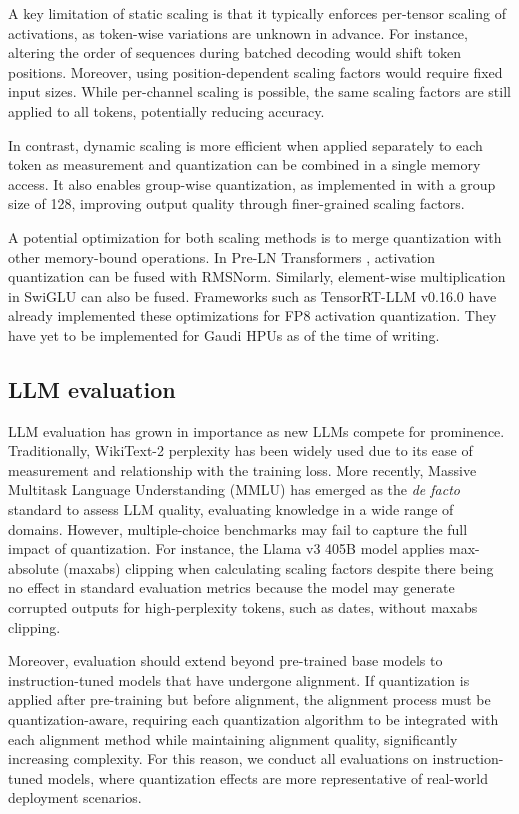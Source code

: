 A key limitation of static scaling is that it typically enforces per-tensor scaling of activations, as token-wise variations are unknown in advance. For instance, altering the order of sequences during batched decoding would shift token positions. Moreover, using position-dependent scaling factors would require fixed input sizes. While per-channel scaling \citep{xiao2024smoothquantaccurateefficientposttraining} is possible, the same scaling factors are still applied to all tokens, potentially reducing accuracy.

In contrast, dynamic scaling is more efficient when applied separately to each token as measurement and quantization can be combined in a single memory access. It also enables group-wise quantization, as implemented in \citet{deepseekai2024deepseekv3technicalreport} with a group size of 128, improving output quality through finer-grained scaling factors.

A potential optimization for both scaling methods is to merge quantization with other memory-bound operations. In Pre-LN Transformers \citep{pre_ln_transformers}, activation quantization can be fused with RMSNorm. Similarly, element-wise multiplication in SwiGLU \citep{shazeer2020gluvariantsimprovetransformer} can also be fused. Frameworks such as TensorRT-LLM \citep{TensorRT_LLM} v0.16.0 have already implemented these optimizations for FP8 activation quantization. 
They have yet to be implemented for Gaudi HPUs as of the time of writing.

\subsection{LLM evaluation}

LLM evaluation has grown in importance as new LLMs compete for prominence. Traditionally, WikiText-2 perplexity \citep{merity2017pointer} has been widely used due to its ease of measurement and relationship with the training loss. More recently, Massive Multitask Language Understanding (MMLU) \citep{hendrycks2021measuring} has emerged as the \textit{de facto} standard to assess LLM quality, evaluating knowledge in a wide range of domains. However, multiple-choice benchmarks may fail to capture the full impact of quantization. For instance, the Llama v3 405B model \citep{grattafiori2024llama3herdmodels} applies max-absolute (maxabs) clipping when calculating scaling factors despite there being no effect in standard evaluation metrics because the model may generate corrupted outputs for high-perplexity tokens, such as dates, without maxabs clipping.

Moreover, evaluation should extend beyond pre-trained base models to instruction-tuned models that have undergone alignment. If quantization is applied after pre-training but before alignment, the alignment process must be quantization-aware, requiring each quantization algorithm to be integrated with each alignment method while maintaining alignment quality, significantly increasing complexity. For this reason, we conduct all evaluations on instruction-tuned models, where quantization effects are more representative of real-world deployment scenarios.

